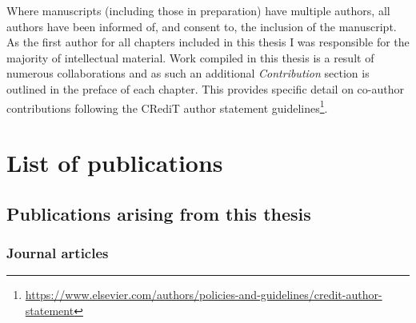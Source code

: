 \documentclass[a4paper, nobind]{templates/ociamthesis}
\begin{document}
Where manuscripts (including those in preparation) have multiple authors, all authors have been informed of, and consent to, the inclusion of the manuscript.
As the first author for all chapters included in this thesis I was responsible for the majority of intellectual material.
Work compiled in this thesis is a result of numerous collaborations and as such an additional \emph{Contribution} section is outlined in the preface of each chapter. This provides specific detail on co-author contributions following the CRediT author statement guidelines\footnote{\url{https://www.elsevier.com/authors/policies-and-guidelines/credit-author-statement}}.

\hypertarget{list-of-publications}{%
\section*{List of publications}\label{list-of-publications}}

\hypertarget{publications-arising-from-this-thesis}{%
\subsection*{Publications arising from this thesis}\label{publications-arising-from-this-thesis}}

\hypertarget{journal-articles}{%
\subsubsection*{Journal articles}\label{journal-articles}}
\end{document}
